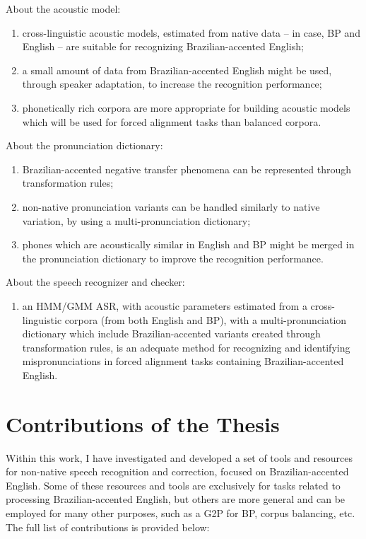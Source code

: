 About the acoustic model:
\begin{enumerate}
 \item cross-linguistic acoustic models, estimated from native data -- in case, \ac{BP} and English -- are suitable for recognizing Brazilian-accented English;
 \item a small amount of data from Brazilian-accented English might be used, through speaker adaptation, to increase the recognition performance;
 \item phonetically rich corpora are more appropriate for building acoustic models which will be used for forced alignment tasks than balanced corpora.
\end{enumerate}
About the pronunciation dictionary:
\begin{enumerate}
 \item Brazilian-accented negative transfer phenomena can be represented through transformation rules;
 \item non-native pronunciation variants can be handled similarly to native variation, by using a  multi-pronunciation dictionary;
 \item phones which are acoustically similar in English and \ac{BP} might be merged in the pronunciation dictionary to improve the recognition performance.
\end{enumerate}
About the speech recognizer and checker:
\begin{enumerate}
 \item an HMM/GMM \ac{ASR}, with acoustic parameters estimated from a cross-linguistic corpora (from both English and \ac{BP}), with a multi-pronunciation dictionary which include Brazilian-accented variants created through transformation rules, is an adequate method for recognizing and identifying mispronunciations in forced alignment tasks containing Brazilian-accented English.
\end{enumerate}

\section{Contributions of the Thesis}

Within this work, I have investigated and developed a set of tools and resources for non-native speech recognition and correction, focused on Brazilian-accented English. Some of these resources and tools are exclusively for tasks related to processing Brazilian-accented English, but others are more general and can be employed for many other purposes, such as a \ac{G2P} for \ac{BP}, corpus balancing, etc. The full list of contributions is provided below:

